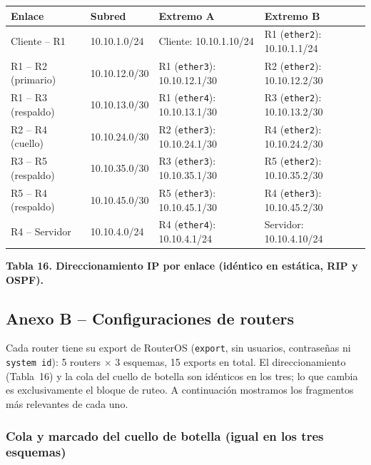 \documentclass[11pt,a4paper]{article}
\newcommand{\figcaption}[1]{\par\noindent\footnotesize\textbf{#1}\par\vspace{0.4cm}}
\begin{document}
\needspace{1cm}
\begin{center}
\begin{minipage}{0.96\linewidth}
\centering
\small
\begin{tabular}{@{}p{2.6cm}p{2.5cm}p{4.3cm}p{4.3cm}@{}}
\toprule
\textbf{Enlace} & \textbf{Subred} & \textbf{Extremo A} & \textbf{Extremo B} \\
\midrule
Cliente -- R1 & 10.10.1.0/24 & Cliente: 10.10.1.10/24 & R1 (\texttt{ether2}): 10.10.1.1/24 \\
R1 -- R2 (primario) & 10.10.12.0/30 & R1 (\texttt{ether3}): 10.10.12.1/30 & R2 (\texttt{ether2}): 10.10.12.2/30 \\
R1 -- R3 (respaldo) & 10.10.13.0/30 & R1 (\texttt{ether4}): 10.10.13.1/30 & R3 (\texttt{ether2}): 10.10.13.2/30 \\
R2 -- R4 (cuello) & 10.10.24.0/30 & R2 (\texttt{ether3}): 10.10.24.1/30 & R4 (\texttt{ether2}): 10.10.24.2/30 \\
R3 -- R5 (respaldo) & 10.10.35.0/30 & R3 (\texttt{ether3}): 10.10.35.1/30 & R5 (\texttt{ether2}): 10.10.35.2/30 \\
R5 -- R4 (respaldo) & 10.10.45.0/30 & R5 (\texttt{ether3}): 10.10.45.1/30 & R4 (\texttt{ether3}): 10.10.45.2/30 \\
R4 -- Servidor & 10.10.4.0/24 & R4 (\texttt{ether4}): 10.10.4.1/24 & Servidor: 10.10.4.10/24 \\
\bottomrule
\end{tabular}
\par\vspace{0.1cm}
\figcaption{Tabla 16. Direccionamiento IP por enlace (id\'entico en est\'atica, RIP y OSPF).}
\end{minipage}
\end{center}

\subsection*{Anexo B -- Configuraciones de routers}

Cada router tiene su export de RouterOS (\texttt{export}, sin usuarios, contrase\~nas ni \texttt{system id}): 5 routers $\times$ 3 esquemas, 15 exports en total. El direccionamiento (Tabla~16) y la cola del cuello de botella son id\'enticos en los tres; lo que cambia es exclusivamente el bloque de ruteo. A continuaci\'on mostramos los fragmentos m\'as relevantes de cada uno.

\subsubsection*{Cola y marcado del cuello de botella (igual en los tres esquemas)}
\end{document}
